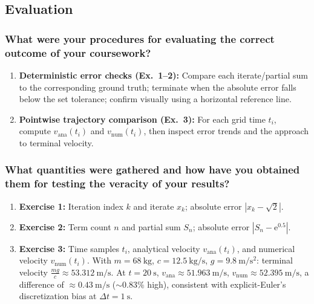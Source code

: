 \subsection{Evaluation}
\label{sec:eval}

\subsubsection{What were your procedures for evaluating the correct outcome of your coursework?}
\begin{enumerate}
  \item \textbf{Deterministic error checks (Ex.~1–2):} Compare each iterate/partial sum to the
  corresponding ground truth; terminate when the absolute error falls below the set tolerance;
  confirm visually using a horizontal reference line.
  \item \textbf{Pointwise trajectory comparison (Ex.~3):} For each grid time \(t_i\), compute
  \(v_{\mathrm{ana}}(t_i)\) and \(v_{\mathrm{num}}(t_i)\), then inspect error trends and the approach to
  terminal velocity.
\end{enumerate}
	
\subsubsection{What quantities were gathered and how have you obtained them for testing the veracity of your results?}
\begin{enumerate}
  \item \textbf{Exercise 1:} Iteration index \(k\) and iterate \(x_k\); absolute error
  \(|x_k-\sqrt{2}|\).
  \item \textbf{Exercise 2:} Term count \(n\) and partial sum \(S_n\); absolute error
  \(|S_n-\mathrm{e}^{0.5}|\).
  \item \textbf{Exercise 3:} Time samples \(t_i\), analytical velocity \(v_{\mathrm{ana}}(t_i)\), and
  numerical velocity \(v_{\mathrm{num}}(t_i)\). With \(m=68~\mathrm{kg}\), \(c=12.5~\mathrm{kg/s}\),
  \(g=9.8~\mathrm{m/s^2}\): terminal velocity \(\tfrac{mg}{c}\approx 53.312~\mathrm{m/s}\).
  At \(t=20~\mathrm{s}\), \(v_{\mathrm{ana}}\approx 51.963~\mathrm{m/s}\),
  \(v_{\mathrm{num}}\approx 52.395~\mathrm{m/s}\), a difference of \(\approx 0.43~\mathrm{m/s}\)
  (\(\sim 0.83\%\) high), consistent with explicit-Euler’s discretization bias at \(\Delta t=1~\mathrm{s}\).
\end{enumerate}





















